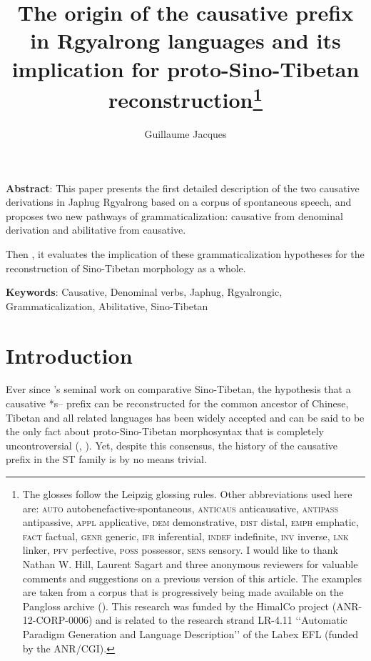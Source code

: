 \documentclass[oldfontcommands,oneside,a4paper,11pt]{article}
\begin{document}
 
\title{The origin of the causative prefix in Rgyalrong languages and its implication for proto-Sino-Tibetan reconstruction\footnote{
The glosses follow the Leipzig glossing rules. Other abbreviations used here are: \textsc{auto}  autobenefactive-spontaneous, \textsc{anticaus} anticausative, \textsc{antipass} antipassive, \textsc{appl} applicative, \textsc{dem} demonstrative,  \textsc{dist} distal, \textsc{emph} emphatic, \textsc{fact} factual, \textsc{genr} generic, \textsc{ifr} inferential, \textsc{indef} indefinite, \textsc{inv} inverse,  \textsc{lnk} linker, \textsc{pfv} perfective, \textsc{poss} possessor,  \textsc{sens} sensory. I would like to thank Nathan W. Hill, Laurent Sagart and three anonymous reviewers for valuable comments and suggestions on a previous version of this article. The examples are taken from a corpus that is progressively being made available on the Pangloss archive (\citealt{michailovsky14pangloss}). This research was funded by the HimalCo project (ANR-12-CORP-0006) and is related to the research strand LR-4.11 ‘‘Automatic Paradigm Generation and Language Description’’ of the Labex EFL (funded by the ANR/CGI). } }
\author{Guillaume Jacques}
\maketitle
\sloppy

\textbf{Abstract}: This paper presents the first detailed description of the two causative derivations in Japhug Rgyalrong based on a corpus of spontaneous speech, and proposes two new pathways of grammaticalization: causative from denominal derivation and abilitative from causative. 

Then , it evaluates the implication of these grammaticalization hypotheses for the reconstruction of Sino-Tibetan morphology as a whole.

\textbf{Keywords}: Causative, Denominal verbs, Japhug, Rgyalrongic, Grammaticalization, Abilitative, Sino-Tibetan

\section{Introduction}

Ever since \citet{conrady1896}'s seminal work on comparative Sino-Tibetan, the hypothesis that a causative *s-- prefix can be reconstructed for the  common ancestor of Chinese, Tibetan and all related languages has been widely accepted and can be said to be the only fact about proto-Sino-Tibetan morphosyntax that is completely uncontroversial (\citealt{wolfenden29outlines, benedict72, matisoff03}, \citealt{lapolla03}).  Yet, despite this consensus, the history of the causative prefix in the ST family is by no means trivial. 
\end{document}
